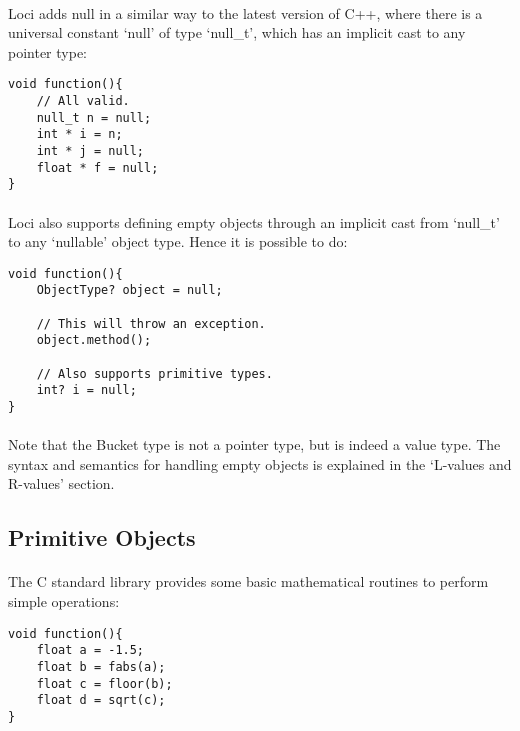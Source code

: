 \documentclass[12pt,twoside,notitlepage]{report}
\begin{document}
\paragraph{}
Loci adds null in a similar way to the latest version of C++, where there is a universal constant `null' of type `null\_t', which has an implicit cast to any pointer type:


\begin{lstlisting}
void function(){
	// All valid.
	null_t n = null;
	int * i = n;
	int * j = null;
	float * f = null;
}
\end{lstlisting}


\paragraph{}
Loci also supports defining empty objects through an implicit cast from `null\_t' to any `nullable' object type. Hence it is possible to do:


\begin{lstlisting}
void function(){
	ObjectType? object = null;
	
	// This will throw an exception.
	object.method();
	
	// Also supports primitive types.
	int? i = null;
}
\end{lstlisting}


\paragraph{}
Note that the Bucket type is not a pointer type, but is indeed a value type. The syntax and semantics for handling empty objects is explained in the `L-values and R-values' section.

\clearpage

\subsection{Primitive Objects}

\paragraph{}
The C standard library provides some basic mathematical routines to perform simple operations:


\begin{lstlisting}
void function(){
	float a = -1.5;
	float b = fabs(a);
	float c = floor(b);
	float d = sqrt(c);
}
\end{lstlisting}
\end{document}

